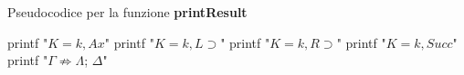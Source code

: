 \documentclass[\main/tesi.tex]{subfiles}
\begin{document}
\begin{algorithm}
    \caption{Pseudocodice per la funzione \textbf{printResult}}\label{alg:printResult}
    \begin{algorithmic}
        \State printf "$K = k, Ax$"
        \State printf "$K = k, L\supset$"
        \State printf "$K = k, R\supset$"
        \State printf "$K = k, Succ$"
        \EndIf
        \State printf "$\Gamma \not\Rightarrow \Lambda$; $\Delta$"
        \EndFor
        \EndProcedure
    \end{algorithmic}
\end{algorithm}
\end{document}
